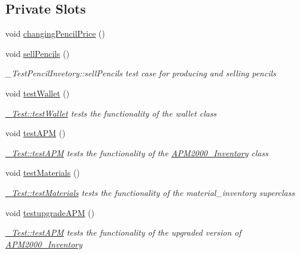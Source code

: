 \subsection*{Private Slots}
\begin{DoxyCompactItemize}
\item 
void \mbox{\hyperlink{class__Test_a9cabdf9e5c265487d99174166d9206ff}{changing\+Pencil\+Price}} ()
\item 
void \mbox{\hyperlink{class__Test_a92dbc86899cfc80c08981ddcace05b5e}{sell\+Pencils}} ()
\begin{DoxyCompactList}\small\item\em \+\_\+\+Test\+Pencil\+Invetory\+::sell\+Pencils test case for producing and selling pencils \end{DoxyCompactList}\item 
void \mbox{\hyperlink{class__Test_afbce4b6817db0c8423dd4296a18f75de}{test\+Wallet}} ()
\begin{DoxyCompactList}\small\item\em \mbox{\hyperlink{class__Test_afbce4b6817db0c8423dd4296a18f75de}{\+\_\+\+Test\+::test\+Wallet}} tests the functionality of the wallet class \end{DoxyCompactList}\item 
void \mbox{\hyperlink{class__Test_adb7f71ea12e1b02afd6b4d1f7d65c1eb}{test\+A\+PM}} ()
\begin{DoxyCompactList}\small\item\em \mbox{\hyperlink{class__Test_adb7f71ea12e1b02afd6b4d1f7d65c1eb}{\+\_\+\+Test\+::test\+A\+PM}} tests the functionality of the \mbox{\hyperlink{classAPM2000__Inventory}{A\+P\+M2000\+\_\+\+Inventory}} class \end{DoxyCompactList}\item 
void \mbox{\hyperlink{class__Test_ad5396e54792008660924db2e16edb614}{test\+Materials}} ()
\begin{DoxyCompactList}\small\item\em \mbox{\hyperlink{class__Test_ad5396e54792008660924db2e16edb614}{\+\_\+\+Test\+::test\+Materials}} tests the functionality of the material\+\_\+inventory superclass \end{DoxyCompactList}\item 
void \mbox{\hyperlink{class__Test_aaf9ee0b20b1e17a5aebfa740ed493d6e}{testupgrade\+A\+PM}} ()
\begin{DoxyCompactList}\small\item\em \mbox{\hyperlink{class__Test_adb7f71ea12e1b02afd6b4d1f7d65c1eb}{\+\_\+\+Test\+::test\+A\+PM}} tests the functionality of the upgraded version of \mbox{\hyperlink{classAPM2000__Inventory}{A\+P\+M2000\+\_\+\+Inventory}} \end{DoxyCompactList}\item 

\end{DoxyCompactItemize}
